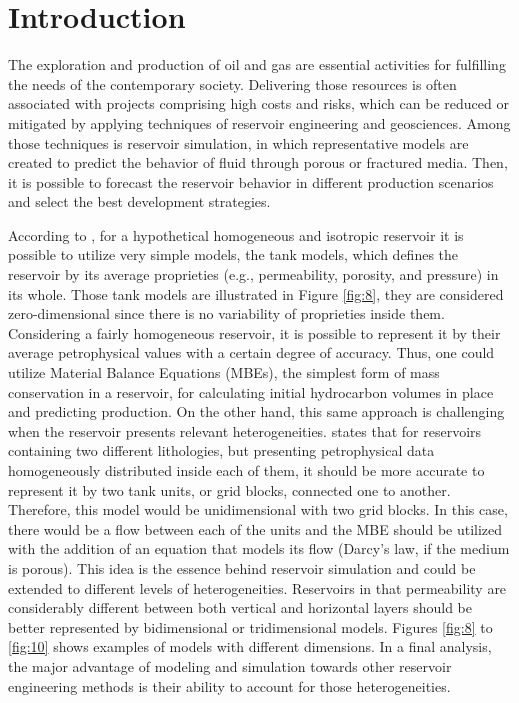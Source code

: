 \chapter{Introduction}

\pagestyle{fancy}
\setcounter{page}{1}

The exploration and production of oil and gas are essential activities for fulfilling the needs of the contemporary society. Delivering those resources is often associated with projects comprising high costs and risks, which can be reduced or mitigated by applying techniques of reservoir engineering and geosciences. Among those techniques is reservoir simulation, in which representative models are created to predict the behavior of fluid through porous or fractured media. Then, it is possible to forecast the reservoir behavior in different production scenarios and select the best development strategies.


According to \cite{Odeh1969}, for a hypothetical homogeneous and isotropic reservoir it is possible to utilize very simple models, the tank models, which defines the reservoir by its average proprieties (e.g., permeability, porosity, and pressure) in its whole. Those tank models are illustrated in Figure \ref{fig:8}, they are considered zero-dimensional since there is no variability of proprieties inside them. Considering a fairly homogeneous reservoir, it is possible to represent it by their average petrophysical values with a certain degree of accuracy. Thus, one could utilize Material Balance Equations (MBEs), the simplest form of mass conservation in a reservoir, for calculating initial hydrocarbon volumes in place and predicting production. On the other hand, this same approach is challenging when the reservoir presents relevant heterogeneities. \cite{Odeh1969} states that for reservoirs containing two different lithologies, but presenting petrophysical data homogeneously distributed inside each of them, it should be more accurate to represent it by two tank units, or grid blocks, connected one to another. Therefore, this model would be unidimensional with two grid blocks. In this case, there would be a flow between each of the units and the MBE should be utilized with the addition of an equation that models its flow (Darcy's law, if the medium is porous). This idea is the essence behind reservoir simulation and could be extended to different levels of heterogeneities. Reservoirs in that permeability are considerably different between both vertical and horizontal layers should be better represented by bidimensional or tridimensional models. Figures \ref{fig:8} to \ref{fig:10} shows examples of models with different dimensions. In a final analysis, the major advantage of modeling and simulation towards other reservoir engineering methods is their ability to account for those heterogeneities.

